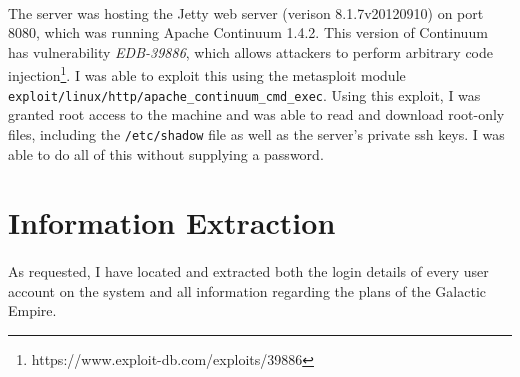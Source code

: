 \documentclass{article}
\begin{document}
\paragraph{}
The server was hosting the Jetty web server (verison 8.1.7v20120910) on port 8080, which was running Apache Continuum 1.4.2.
This version of Continuum has vulnerability \emph{EDB-39886}, which allows attackers to perform arbitrary code injection\footnote{https://www.exploit-db.com/exploits/39886}.
I was able to exploit this using the metasploit module \texttt{exploit/linux/http/apache\_continuum\_cmd\_exec}.
Using this exploit, I was granted root access to the machine and was able to read and download root-only files, including the \texttt{/etc/shadow} file as well as the server's private ssh keys.
I was able to do all of this without supplying a password.

\newpage

\section{Information Extraction}
\label{sec:info_extraction}
\paragraph{}
As requested, I have located and extracted both the login details of every user account on the system and all information regarding the plans of the Galactic Empire.
\end{document}
